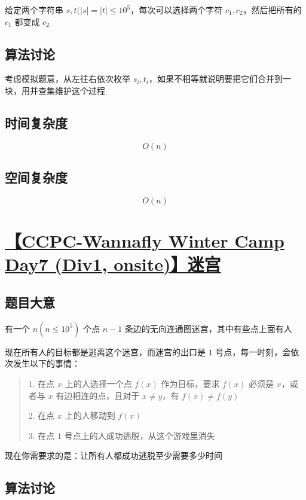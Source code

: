 \documentclass[UTF8]{article}
\begin{document}
给定两个字符串 $s,t(|s|=|t| \le 10^5$，每次可以选择两个字符 $c_1,c_2$，然后把所有的 $c_1$ 都变成 $c_2$

\subsection{算法讨论}

考虑模拟题意，从左往右依次枚举 $s_i,t_i$，如果不相等就说明要把它们合并到一块，用并查集维护这个过程

\subsection{时间复杂度}

$$
O(n)
$$

\subsection{空间复杂度}

$$
O(n)
$$

\section{\href{https://zhixincode.com/contest/24/problem/A?problem_id=349}{【CCPC-Wannafly Winter Camp Day7 (Div1, onsite)】迷宫}}

\subsection{题目大意}

有一个 $n(n \le 10^5)$ 个点 $n-1$ 条边的无向连通图迷宫，其中有些点上面有人

现在所有人的目标都是逃离这个迷宫，而迷宫的出口是 $1$ 号点，每一时刻，会依次发生以下的事情：

\begin{quotation}
1. 在点 $x$ 上的人选择一个点 $f(x)$ 作为目标，要求 $f(x)$ 必须是 $x$，或者与 $x$ 有边相连的点，且对于 $x\neq y$，有 $f(x)\neq f(y)$

2. 在点 $x$ 上的人移动到 $f(x)$

3. 在点 $1$ 号点上的人成功逃脱，从这个游戏里消失
\end{quotation}

现在你需要求的是：让所有人都成功逃脱至少需要多少时间

\subsection{算法讨论}
\end{document}
